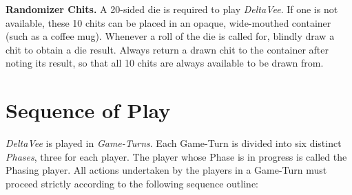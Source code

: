 \bigskip

\textbf{Randomizer Chits.} A 20-sided die is required to play
\emph{DeltaVee}. If one is not available, these 10 chits can be placed
in an opaque, wide-mouthed container (such as a coffee mug). Whenever
a roll of the die is called for, blindly draw a chit to obtain a die
result. Always return a drawn chit to the container after noting its
result, so that all 10 chits are always available to be drawn from.

\section{Sequence of Play}
\label{sec:sequence-play}


\emph{DeltaVee} is played in \emph{Game-Turns}. Each Game-Turn is
divided into six distinct \emph{Phases}, three for each player. The
player whose Phase is in progress is called the Phasing player. All
actions undertaken by the players in a Game-Turn must proceed strictly
according to the following sequence outline:

